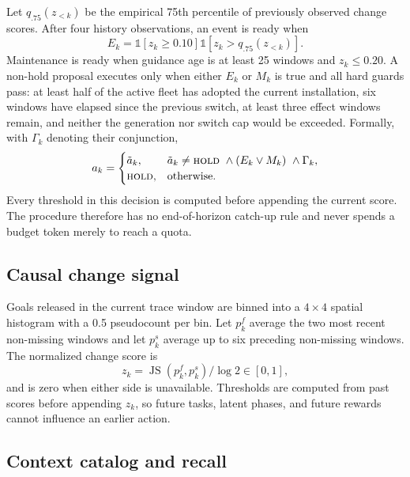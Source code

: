 \documentclass[sigconf,review,anonymous]{acmart}
\begin{document}
Let $q_{.75}(z_{<k})$ be the empirical 75th percentile of previously observed
change scores. After four history observations, an event is ready when
\begin{equation}
 E_k=\mathbb{1}\!\left[z_k\geq0.10\right]
     \mathbb{1}\!\left[z_k>q_{.75}(z_{<k})\right].
\end{equation}
Maintenance is ready when guidance age is at least 25 windows and
$z_k\leq0.20$. A non-hold proposal executes only when either $E_k$ or $M_k$
is true and all hard guards pass: at least half of the active fleet has adopted
the current installation, six windows have elapsed since the previous switch,
at least three effect windows remain, and neither the generation nor switch
cap would be exceeded. Formally, with $\Gamma_k$ denoting their conjunction,
\begin{equation}
 a_k=\begin{cases}
       \tilde a_k,& \tilde a_k\neq\textsc{hold}\ \wedge
                    (E_k\vee M_k)\ \wedge\Gamma_k,\\
       \textsc{hold},&\text{otherwise}.
     \end{cases}
 \label{eq:realized-action}
\end{equation}
Every threshold in this decision is computed before appending the current
score. The procedure therefore has no end-of-horizon catch-up rule and never
spends a budget token merely to reach a quota.

\subsection{Causal change signal}

Goals released in the current trace window are binned into a $4\times4$
spatial histogram with a 0.5 pseudocount per bin. Let $p_k^f$ average the two
most recent non-missing windows and let $p_k^s$ average up to six preceding
non-missing windows. The normalized change score is
\begin{equation}
 z_k=\operatorname{JS}(p_k^f,p_k^s)/\log 2\in[0,1],
\end{equation}
and is zero when either side is unavailable. Thresholds are computed from
past scores before appending $z_k$, so future tasks, latent phases, and future
rewards cannot influence an earlier action.

\subsection{Context catalog and recall}
\end{document}
